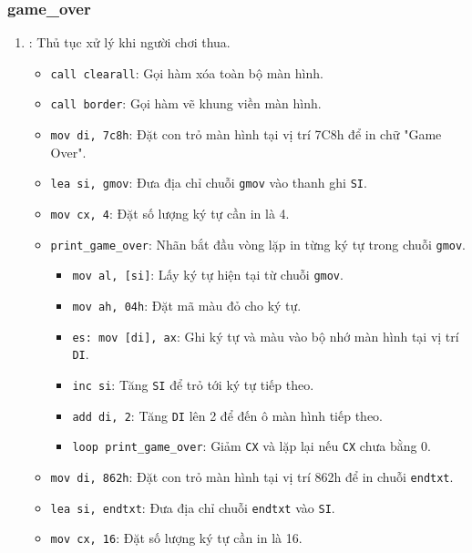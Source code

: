 \documentclass[12pt]{article}
\begin{document}
\subsubsection*{game\_over}
\begin{enumerate}[label=\textbf{\arabic*.}]
      \begin{figure}[H]
  \centering
  \texttt{[image: pics/game-over.png]}
\end{figure}
    \item \texttt{}: Thủ tục xử lý khi người chơi thua.
    
    \begin{itemize}
        \item \texttt{call clearall}: Gọi hàm xóa toàn bộ màn hình.
        \item \texttt{call border}: Gọi hàm vẽ khung viền màn hình.
        \item \texttt{mov di, 7c8h}: Đặt con trỏ màn hình tại vị trí 7C8h để in chữ "Game Over".
        \item \texttt{lea si, gmov}: Đưa địa chỉ chuỗi \texttt{gmov} vào thanh ghi \texttt{SI}.
        \item \texttt{mov cx, 4}: Đặt số lượng ký tự cần in là 4.
        
        \item \texttt{print\_game\_over}: Nhãn bắt đầu vòng lặp in từng ký tự trong chuỗi \texttt{gmov}.
        
        \begin{itemize}
            \item \texttt{mov al, [si]}: Lấy ký tự hiện tại từ chuỗi \texttt{gmov}.
            \item \texttt{mov ah, 04h}: Đặt mã màu đỏ cho ký tự.
            \item \texttt{es: mov [di], ax}: Ghi ký tự và màu vào bộ nhớ màn hình tại vị trí \texttt{DI}.
            \item \texttt{inc si}: Tăng \texttt{SI} để trỏ tới ký tự tiếp theo.
            \item \texttt{add di, 2}: Tăng \texttt{DI} lên 2 để đến ô màn hình tiếp theo.
            \item \texttt{loop print\_game\_over}: Giảm \texttt{CX} và lặp lại nếu \texttt{CX} chưa bằng 0.
        \end{itemize}

        \item \texttt{mov di, 862h}: Đặt con trỏ màn hình tại vị trí 862h để in chuỗi \texttt{endtxt}.
        \item \texttt{lea si, endtxt}: Đưa địa chỉ chuỗi \texttt{endtxt} vào \texttt{SI}.
        \item \texttt{mov cx, 16}: Đặt số lượng ký tự cần in là 16.


\end{itemize}
\end{enumerate}
\end{document}
